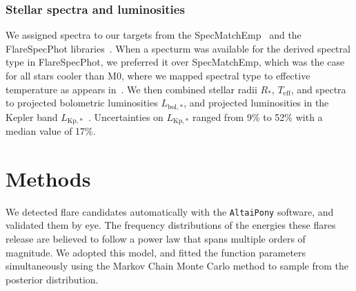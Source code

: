 \documentclass{aa}
\begin{document}
\subsubsection{Stellar spectra and luminosities}
\label{sec:lum}
We assigned spectra to our targets from the SpecMatchEmp~\citep{yee_specmatch_2017} and the FlareSpecPhot libraries~\citep{Schmidt2014b, Kirkpatrick2010, Burgasser2007, Burgasser2008, Burgasser2010, Burgasser2004, Cruz2004, Burgasser2006, Rayner2009, Doi2010, Filippazzo2015, Cruz2003, West2011, Bochanski2010,  Bochanski2007, Schmidt2010, Schmidt2015, Schmidt2014a, mann_how_2015}. When a specturm was available for the derived spectral type in FlareSpecPhot, we preferred it over SpecMatchEmp, which was the case for all stars cooler than M0, where we mapped spectral type to effective temperature as appears in~\citet{pecaut_intrinsic_2013}. We then combined stellar radii $R_*$, $T_\mathrm{eff}$, and spectra to projected bolometric luminosities $L_{\mathrm{bol,*}}$, and projected luminosities in the Kepler band $L_{\mathrm{Kp,*}}$~\citep{shibayama_superflares_2013,ilin_flares_2019}. Uncertainties on $L_{\mathrm{Kp,*}}$ ranged from 9\;\% to 52\;\% with a median value of 17\;\%.
\section{Methods}
We detected flare candidates automatically with the \texttt{AltaiPony} software, and validated them by eye.  %
The frequency distributions of the energies these flares release are believed to follow a power law that spans multiple orders of magnitude. We adopted this model, and fitted the function parameters simultaneously using the Markov Chain Monte Carlo method to sample from the posterior distribution. 
\end{document}
